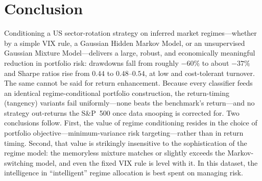 \documentclass[12pt,a4paper]{article}
\begin{document}
\section{Conclusion}\label{sec:concl}
Conditioning a US sector-rotation strategy on inferred market regimes---whether by a simple
VIX rule, a Gaussian Hidden Markov Model, or an unsupervised Gaussian Mixture
Model---delivers a large, robust, and economically meaningful reduction in portfolio risk:
drawdowns fall from roughly $-60\%$ to about $-37\%$ and Sharpe ratios rise from $0.44$ to
$0.48$--$0.54$, at low and cost-tolerant turnover. The same cannot be said for return
enhancement. Because every classifier feeds an identical regime-conditional portfolio
construction, the return-timing (tangency) variants fail uniformly---none beats the
benchmark's return---and no strategy out-returns the S\&P~500 once data snooping is
corrected for. Two conclusions follow. First, the value of regime conditioning resides in
the choice of portfolio objective---minimum-variance risk targeting---rather than in return
timing. Second, that value is strikingly insensitive to the sophistication of the regime
model: the memoryless mixture matches or slightly exceeds the Markov-switching model, and
even the fixed VIX rule is level with it. In this dataset, the intelligence in ``intelligent'' regime
allocation is best spent on managing risk.
\end{document}
